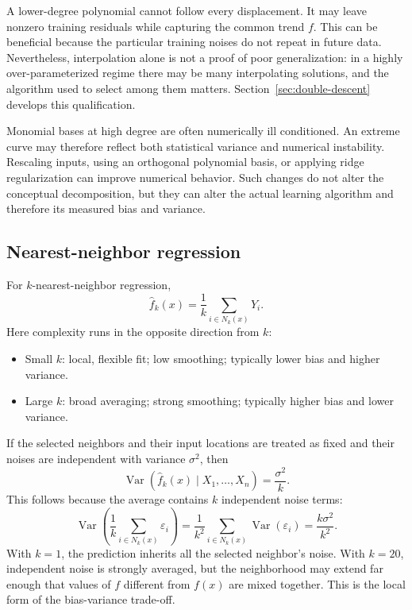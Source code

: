 \documentclass[11pt,a4paper]{article}
\begin{document}
A lower-degree polynomial cannot follow every displacement. It may leave nonzero training residuals while capturing the common trend $f$. This can be beneficial because the particular training noises do not repeat in future data. Nevertheless, interpolation alone is not a proof of poor generalization: in a highly over-parameterized regime there may be many interpolating solutions, and the algorithm used to select among them matters. Section~\ref{sec:double-descent} develops this qualification.

Monomial bases at high degree are often numerically ill conditioned. An extreme curve may therefore reflect both statistical variance and numerical instability. Rescaling inputs, using an orthogonal polynomial basis, or applying ridge regularization can improve numerical behavior. Such changes do not alter the conceptual decomposition, but they can alter the actual learning algorithm and therefore its measured bias and variance.

\subsection{Nearest-neighbor regression}

For $k$-nearest-neighbor regression,
\begin{equation}
  \widehat f_k(x)=\frac{1}{k}\sum_{i\in N_k(x)}Y_i.
\end{equation}
Here complexity runs in the opposite direction from $k$:
\begin{itemize}
  \item Small $k$: local, flexible fit; low smoothing; typically lower bias and higher variance.
  \item Large $k$: broad averaging; strong smoothing; typically higher bias and lower variance.
\end{itemize}
If the selected neighbors and their input locations are treated as fixed and their noises are independent with variance $\sigma^2$, then
\begin{equation}
  \operatorname{Var}(\widehat f_k(x)\mid X_1,\ldots,X_n)
  =\frac{\sigma^2}{k}.
\end{equation}
This follows because the average contains $k$ independent noise terms:
\begin{equation*}
  \operatorname{Var}\left(\frac{1}{k}\sum_{i\in N_k(x)}\varepsilon_i\right)
  =\frac{1}{k^2}\sum_{i\in N_k(x)}\operatorname{Var}(\varepsilon_i)
  =\frac{k\sigma^2}{k^2}.
\end{equation*}
With $k=1$, the prediction inherits all the selected neighbor's noise. With $k=20$, independent noise is strongly averaged, but the neighborhood may extend far enough that values of $f$ different from $f(x)$ are mixed together. This is the local form of the bias-variance trade-off.
\end{document}
